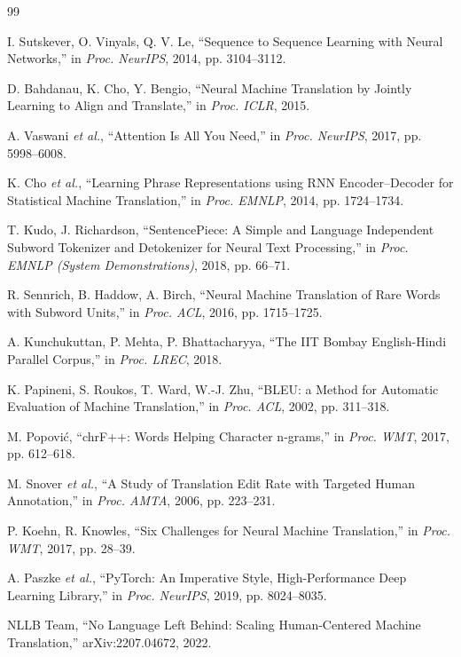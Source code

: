 \documentclass[a4paper,12pt]{vpcoe}
\begin{document}
\begin{thebibliography}{99}

I. Sutskever, O. Vinyals, Q. V. Le, ``Sequence to Sequence Learning with Neural Networks,'' in \emph{Proc. NeurIPS}, 2014, pp. 3104--3112.

D. Bahdanau, K. Cho, Y. Bengio, ``Neural Machine Translation by Jointly Learning to Align and Translate,'' in \emph{Proc. ICLR}, 2015.

A. Vaswani \emph{et al.}, ``Attention Is All You Need,'' in \emph{Proc. NeurIPS}, 2017, pp. 5998--6008.

K. Cho \emph{et al.}, ``Learning Phrase Representations using RNN Encoder--Decoder for Statistical Machine Translation,'' in \emph{Proc. EMNLP}, 2014, pp. 1724--1734.

T. Kudo, J. Richardson, ``SentencePiece: A Simple and Language Independent Subword Tokenizer and Detokenizer for Neural Text Processing,'' in \emph{Proc. EMNLP (System Demonstrations)}, 2018, pp. 66--71.

R. Sennrich, B. Haddow, A. Birch, ``Neural Machine Translation of Rare Words with Subword Units,'' in \emph{Proc. ACL}, 2016, pp. 1715--1725.

A. Kunchukuttan, P. Mehta, P. Bhattacharyya, ``The IIT Bombay English-Hindi Parallel Corpus,'' in \emph{Proc. LREC}, 2018.

K. Papineni, S. Roukos, T. Ward, W.-J. Zhu, ``BLEU: a Method for Automatic Evaluation of Machine Translation,'' in \emph{Proc. ACL}, 2002, pp. 311--318.

M. Popovi\'c, ``chrF++: Words Helping Character n-grams,'' in \emph{Proc. WMT}, 2017, pp. 612--618.

M. Snover \emph{et al.}, ``A Study of Translation Edit Rate with Targeted Human Annotation,'' in \emph{Proc. AMTA}, 2006, pp. 223--231.

P. Koehn, R. Knowles, ``Six Challenges for Neural Machine Translation,'' in \emph{Proc. WMT}, 2017, pp. 28--39.

A. Paszke \emph{et al.}, ``PyTorch: An Imperative Style, High-Performance Deep Learning Library,'' in \emph{Proc. NeurIPS}, 2019, pp. 8024--8035.

NLLB Team, ``No Language Left Behind: Scaling Human-Centered Machine Translation,'' arXiv:2207.04672, 2022.

\end{thebibliography}
\end{document}

